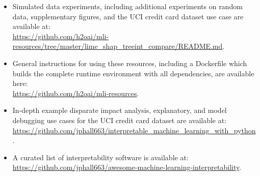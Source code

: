 \documentclass[sigconf]{acmart}
\begin{document}
\begin{itemize}

	\item Simulated data experiments, including additional experiments on random data, supplementary figures, and the UCI credit card dataset use case are available at:\\
	
		\url{https://github.com/h2oai/mli-resources/tree/master/lime_shap_treeint_compare/README.md}.\\ 
	      
	\item General instructions for using these resources, including a Dockerfile which builds the complete runtime environment with all dependencies, are available here:\\
	      
		\url{https://github.com/h2oai/mli-resources}.\\

	\item In-depth example disparate impact analysis, explanatory, and model debugging use cases for the UCI credit card dataset are available at:\\ 
	
		\url{https://github.com/jphall663/interpretable_machine_learning_with_python}.\\

	\item A curated list of interpretability software is available at:\\
	
		 \url{https://github.com/jphall663/awesome-machine-learning-interpretability}.

\end{itemize}
\end{document}
